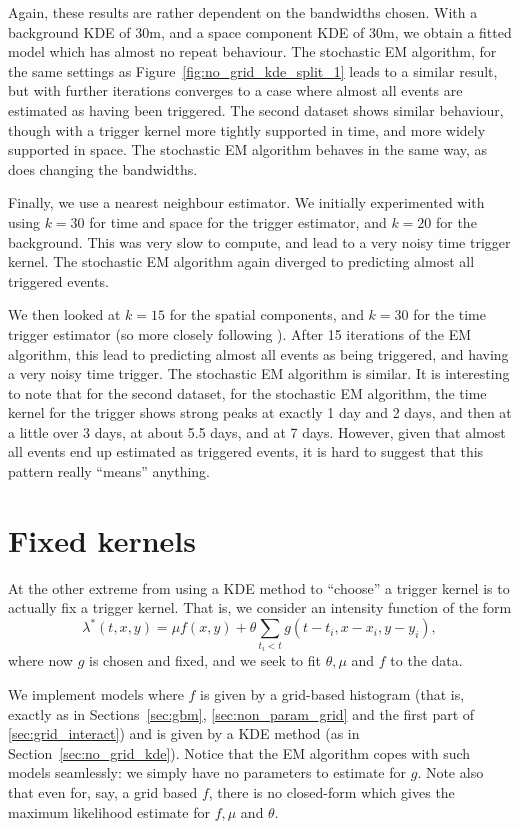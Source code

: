 \documentclass[twoside,a4paper]{article}
\theoremstyle{plain}
\theoremstyle{definition}
\begin{document}
Again, these results are rather dependent on the bandwidths chosen.  With a background
KDE of 30m, and a space component KDE of 30m, we obtain a fitted model which has almost
no repeat behaviour.  The stochastic EM algorithm, for the same settings as 
Figure~\ref{fig:no_grid_kde_split_1} leads to a similar result, but with further iterations
converges to a case where almost all events are estimated as having been triggered.
The second dataset shows similar behaviour, though with a trigger kernel more tightly
supported in time, and more widely supported in space.  The stochastic EM algorithm behaves
in the same way, as does changing the bandwidths.

Finally, we use a nearest neighbour estimator.  We initially experimented with
using $k=30$ for time and space for the trigger estimator, and $k=20$ for the background.
This was very slow to compute, and lead to a very noisy time trigger kernel.  The
stochastic EM algorithm again diverged to predicting almost all triggered events.

We then looked at $k=15$ for the spatial components, and $k=30$ for the time trigger estimator
(so more closely following \cite{sepp2, rc}).  After 15 iterations of the EM algorithm,
this lead to predicting almost all events as being triggered, and having a very noisy time
trigger.  The stochastic EM algorithm is similar.  It is interesting to note that for the
second dataset, for the stochastic EM algorithm, the time kernel for the trigger shows
strong peaks at exactly 1 day and 2 days, and then at a little over 3 days, at about 5.5 days,
and at 7 days.  However, given that almost all events end up estimated as triggered events,
it is hard to suggest that this pattern really ``means'' anything.



\section{Fixed kernels}\label{sec:fixed}

At the other extreme from using a KDE method to ``choose'' a trigger kernel is to actually
fix a trigger kernel.  That is, we consider an intensity function of the form
\[ \lambda^*(t,x,y) = \mu f(x,y) + \theta \sum_{t_i < t} g(t-t_i, x-x_i, y-y_i), \]
where now $g$ is chosen and fixed, and we seek to fit $\theta, \mu$ and $f$ to the data.

We implement models where $f$ is given by a grid-based histogram (that is, exactly as in
Sections~\ref{sec:gbm}, \ref{sec:non_param_grid} and the first part of \ref{sec:grid_interact})
and is given by a KDE method (as in Section~\ref{sec:no_grid_kde}).  Notice that the EM
algorithm copes with such models seamlessly: we simply have no parameters to estimate for $g$.
Note also that even for, say, a grid based $f$, there is no closed-form which gives the maximum
likelihood estimate for $f, \mu$ and $\theta$.
\end{document}
